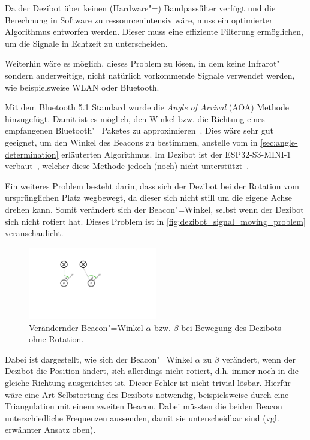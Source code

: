 {Da der Dezibot über keinen (Hardware"=) Bandpassfilter verfügt und die Berechnung in Software zu ressourcenintensiv wäre, muss ein optimierter Algorithmus entworfen werden. Dieser muss eine effiziente Filterung ermöglichen, um die Signale in Echtzeit zu unterscheiden.

Weiterhin wäre es möglich, dieses Problem zu lösen, in dem keine Infrarot"= sondern anderweitige, nicht natürlich vorkommende Signale verwendet werden, wie beispielsweise WLAN oder Bluetooth.

Mit dem Bluetooth 5.1 Standard wurde die \emph{Angle of Arrival} (AOA) Methode hinzugefügt. Damit ist es möglich, den Winkel bzw. die Richtung eines empfangenen Bluetooth"=Paketes zu approximieren~\cite[][Abschnitt 8.1]{bluetoothsigincBluetoothCoreSpecification2019}. Dies wäre sehr gut geeignet, um den Winkel des Beacons zu bestimmen, anstelle vom in \autoref{sec:angle-determination} erläuterten Algorithmus. Im Dezibot ist der ESP32-S3-MINI-1 verbaut~\cite{fingerleDokumentationDezibot42025}, welcher diese Methode jedoch (noch) nicht unterstützt~\cite{espressifsystemsshanghaico.ltdMajorFeatureSupport2024}.

Ein weiteres Problem besteht darin, dass sich der Dezibot bei der Rotation vom ursprünglichen Platz wegbewegt, da dieser sich nicht still um die eigene Achse drehen kann. Somit verändert sich der Beacon"=Winkel, selbst wenn der Dezibot sich nicht rotiert hat. Dieses Problem ist in \autoref{fig:dezibot_signal_moving_problem} veranschaulicht.

\begin{figure}[h]
    \centering
    \includegraphics[width=0.5\textwidth]{../assets/dezibot_signal_moving_problem.pdf}
    \caption{Verändernder Beacon"=Winkel $\alpha$ bzw. $\beta$ bei Bewegung des Dezibots ohne Rotation.}
    \label{fig:dezibot_signal_moving_problem}
\end{figure}

Dabei ist dargestellt, wie sich der Beacon"=Winkel $\alpha$ zu $\beta$ verändert, wenn der Dezibot die Position ändert, sich allerdings nicht rotiert, d.h. immer noch in die gleiche Richtung ausgerichtet ist. Dieser Fehler ist nicht trivial lösbar. Hierfür wäre eine Art Selbstortung des Dezibots notwendig, beispielsweise durch eine Triangulation mit einem zweiten Beacon. Dabei müssten die beiden Beacon unterschiedliche Frequenzen aussenden, damit sie unterscheidbar sind (vgl. erwähnter Ansatz oben).

}
